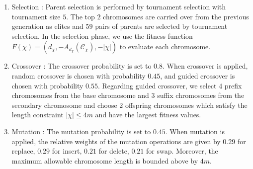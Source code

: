 \documentclass{article}
\begin{document}
\begin{enumerate}
\begin{enumerate}
        \item Selection : Parent selection is performed by tournament selection with tournament size $5$. The top $2$ chromosomes are carried over from the previous generation as elites and $59$ pairs of parents are selected by tournament selection. In the selection phase, we use the fitness function $F(\chi)=\left(d_{\chi},-A_{d_{\chi}}(\mathcal{C}_{\chi}),-|\chi|\right)$ to evaluate each chromosome.

        \item Crossover : The crossover probability is set to $0.8$. When crossover is applied, random crossover is chosen with probability $0.45$, and guided crossover is chosen with probability $0.55$. Regarding guided crossover, we select $4$ prefix chromosomes from the base chromosome and $3$ suffix chromosomes from the secondary chromosome and choose $2$ offspring chromosomes which satisfy the length constraint $|\chi|\leq 4m$ and have the largest fitness values.

        \item Mutation : The mutation probability is set to $0.45$. When mutation is applied, the relative weights of the mutation operations are given by $0.29$ for replace, $0.29$ for insert, $0.21$ for delete, $0.21$ for swap. Moreover, the maximum allowable chromosome length is bounded above by $4m$.


\end{enumerate}
\end{enumerate}
\end{document}
